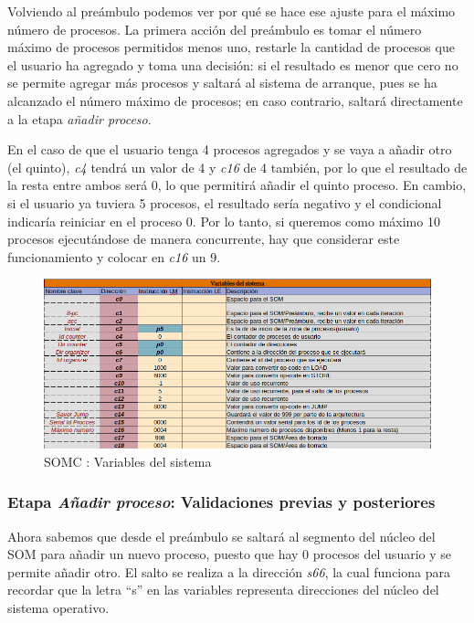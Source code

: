\documentclass[letterpaper,12pt,oneside]{book}
\begin{document}
            Volviendo al preámbulo podemos ver por qué se hace ese ajuste para el máximo número de procesos. La primera acción del preámbulo
			es tomar el número máximo de procesos permitidos menos uno, restarle la cantidad
			de procesos que el usuario ha agregado y toma una decisión: si el resultado es menor que cero no se permite agregar más procesos
			y saltará
			al sistema de arranque, pues se ha alcanzado el número máximo de procesos; en caso
			contrario, saltará directamente a la etapa  \textit{añadir proceso}. 
			
			En el caso de que el usuario tenga 4 procesos agregados y se vaya a 
			añadir 
			otro (el quinto),
			\textit{c4} tendrá un valor de 4 y \textit{c16} de 4 también, por lo que el resultado de la resta entre ambos será 0, lo que permitirá 
			añadir el quinto proceso. En
			cambio, si el usuario ya tuviera 5 procesos, el resultado sería negativo y el condicional indicaría reiniciar en el proceso 0. Por lo tanto,
			si queremos como máximo 10 procesos ejecutándose de manera concurrente, hay que considerar este funcionamiento y colocar en \textit{c16} un 
			9.
			
						
			
			\begin{figure}[h]		
			\centering
			\includegraphics[scale=0.56]{media/CARDIACC/VariablesDelSistema.png}
			\caption{SOMC : Variables del sistema}
			\label{fig:somcVariablesSis}
		\end{figure}

            \subsubsection{Etapa \textit{Añadir proceso}: Validaciones previas y posteriores}
			Ahora sabemos que desde el preámbulo se saltará al segmento del núcleo del SOM para añadir un nuevo proceso, puesto
			que hay 0 procesos del usuario y se permite añadir otro. El salto se realiza a la dirección \textit{s66}, la cual funciona para recordar
			que la letra ``s'' en las variables representa
			direcciones del núcleo del sistema operativo.
   
\end{document}
